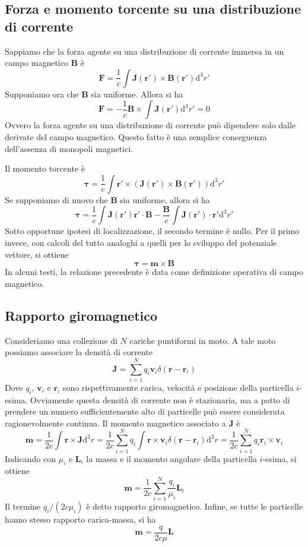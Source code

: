 \documentclass[a4paper,11pt]{book}
\newcommand{\dif}{\mathrm{d}}
\renewcommand{\vec}[1]{\mathbf{#1}}
\theoremstyle{theorem}
\theoremstyle{definition}
\begin{document}
\subsection{Forza e momento torcente su una distribuzione di corrente}
Sappiamo che la forza agente su una distribuzione di corrente immersa in un campo magnetico $\vec{B}$ è
\[\vec{F}=\frac{1}{c}\int\vec{J}(\vec{r}')\times\vec{B}(\vec{r}')\dif^3r'\]
Supponiamo ora che $\vec{B}$ sia uniforme. Allora si ha
\[\vec{F}=-\frac{1}{c}\vec{B}\times\int\vec{J}(\vec{r}')\dif^3r'=0\]
Ovvero la forza agente su una distribuzione di corrente può dipendere solo dalle derivate del campo magnetico. Questo fatto è una semplice conseguenza dell'assenza di monopoli magnetici.

Il momento torcente è 
\[\vec{\tau}=\frac{1}{c}\int\vec{r}'\times(\vec{J}(\vec{r}')\times\vec{B}(\vec{r}'))\dif^3r'\]
Se supponiamo di nuovo che $\vec{B}$ sia uniforme, allora si ha
\[\vec{\tau}=\frac{1}{c}\int\vec{J}(\vec{r}')\vec{r}'\cdot\vec{B}-\frac{\vec{B}}{c}\int\vec{J}(\vec{r}')\cdot\vec{r}'\dif^3r'\]
Sotto opportune ipotesi di localizzazione, il secondo termine è nullo. Per il primo invece, con calcoli del tutto analoghi a quelli per lo sviluppo del potenziale vettore, si ottiene
\[\vec{\tau}=\vec{m}\times\vec{B}\]
In alcuni testi, la relazione precedente è data come definizione operativa di campo magnetico.
\subsection{Rapporto giromagnetico}
Consideriamo una collezione di $N$ cariche puntiformi in moto. A tale moto possiamo associare la densità di corrente
\[\vec{J}=\sum_{i=1}^{N}q_i\vec{v}_i\delta(\vec{r}-\vec{r}_i)\]
Dove $q_i$, $\vec{v}_i$ e $\vec{r}_i$ sono rispettivamente carica, velocità e posizione della particella $i$-esima. Ovviamente questa densità di corrente non è stazionaria, ma a patto di prendere un numero sufficientemente alto di particelle può essere considerata ragionevolmente continua. Il momento magnetico associato a $\vec{J}$ è
\[\vec{m}=\frac{1}{2c}\int\vec{r}\times\vec{J}\dif^3r=\frac{1}{2c}\sum_{i=1}^{N}q_i\int\vec{r}\times\vec{v}_i\delta(\vec{r}-\vec{r}_i)\dif^3r=\frac{1}{2c}\sum_{i=1}^{N}q_i\vec{r}_i\times\vec{v}_i \]
Indicando con $\mu_i$ e $\vec{L}_i$ la massa e il momento angolare della particella $i$-esima, si ottiene
\[\vec{m}=\frac{1}{2c}\sum_{i=1}^{N}\frac{q_i}{\mu_i}\vec{L}_i\]
Il termine $q_i/(2c\mu_i)$ è detto rapporto giromagnetico. Infine, se tutte le particelle hanno stesso rapporto carica-massa, si ha
\[\vec{m}=\frac{q}{2c\mu}\vec{L}\]
\newpage
\end{document}
